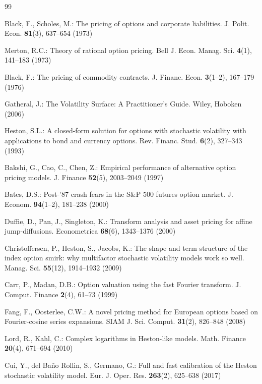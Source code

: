 \documentclass[runningheads]{llncs}
\begin{document}
\begin{thebibliography}{99}

Black, F., Scholes, M.: The pricing of options and corporate liabilities.
J. Polit. Econ. \textbf{81}(3), 637--654 (1973)

Merton, R.C.: Theory of rational option pricing. Bell J. Econ. Manag. Sci.
\textbf{4}(1), 141--183 (1973)

Black, F.: The pricing of commodity contracts. J. Financ. Econ.
\textbf{3}(1--2), 167--179 (1976)

Gatheral, J.: The Volatility Surface: A Practitioner's Guide. Wiley, Hoboken
(2006)

Heston, S.L.: A closed-form solution for options with stochastic volatility
with applications to bond and currency options. Rev. Financ. Stud.
\textbf{6}(2), 327--343 (1993)

Bakshi, G., Cao, C., Chen, Z.: Empirical performance of alternative option
pricing models. J. Finance \textbf{52}(5), 2003--2049 (1997)

Bates, D.S.: Post-'87 crash fears in the S\&P 500 futures option market.
J. Econom. \textbf{94}(1--2), 181--238 (2000)

Duffie, D., Pan, J., Singleton, K.: Transform analysis and asset pricing for
affine jump-diffusions. Econometrica \textbf{68}(6), 1343--1376 (2000)

Christoffersen, P., Heston, S., Jacobs, K.: The shape and term structure of the
index option smirk: why multifactor stochastic volatility models work so well.
Manag. Sci. \textbf{55}(12), 1914--1932 (2009)

Carr, P., Madan, D.B.: Option valuation using the fast Fourier transform.
J. Comput. Finance \textbf{2}(4), 61--73 (1999)

Fang, F., Oosterlee, C.W.: A novel pricing method for European options based on
Fourier-cosine series expansions. SIAM J. Sci. Comput. \textbf{31}(2),
826--848 (2008)

Lord, R., Kahl, C.: Complex logarithms in Heston-like models. Math. Finance
\textbf{20}(4), 671--694 (2010)

Cui, Y., del Ba\~{n}o Rollin, S., Germano, G.: Full and fast calibration of the
Heston stochastic volatility model. Eur. J. Oper. Res. \textbf{263}(2),
625--638 (2017)


\end{thebibliography}
\end{document}
